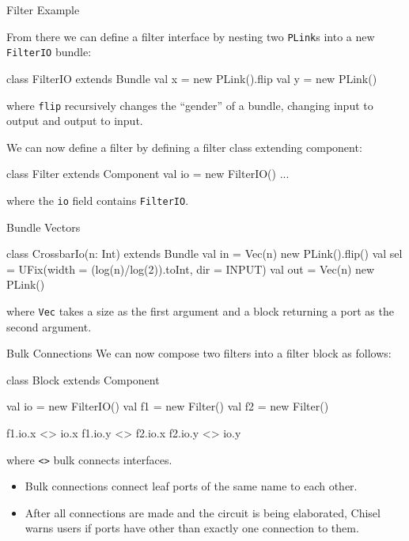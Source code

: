 \documentclass[xcolor=pdflatex,dvipsnames,table]{beamer}
\begin{document}
\begin{frame}{Filter Example}

From there we can define a filter interface by nesting two
\verb+PLink+s into a new \verb+FilterIO+ bundle:

\begin{scala}
class FilterIO extends Bundle { 
  val x = new PLink().flip
  val y = new PLink()
}
\end{scala}

\noindent
where \verb+flip+ recursively changes the ``gender'' of a bundle,
changing input to output and output to input.

We can now define a filter by defining a filter class extending component:

\begin{scala}
class Filter extends Component { 
  val io = new FilterIO()
  ...
}
\end{scala}

\noindent 
where the \verb+io+ field contains \verb+FilterIO+. 

\end{frame}

\begin{frame}[fragile]{Bundle Vectors}

\begin{scala}
class CrossbarIo(n: Int) extends Bundle {
  val in  = Vec(n){ new PLink().flip() }
  val sel = UFix(width = (log(n)/log(2)).toInt, dir = INPUT)
  val out = Vec(n){ new PLink() }
}
\end{scala}

\noindent
where \verb+Vec+ takes a size as the first argument and a block returning a port as the second argument.

\end{frame}

\begin{frame}[fragile]{Bulk Connections}
We can now compose two filters into a filter block as follows:

\begin{scala}
class Block extends Component { 
  val io = new FilterIO()
  val f1 = new Filter()
  val f2 = new Filter()

  f1.io.x <> io.x
  f1.io.y <> f2.io.x
  f2.io.y <> io.y
}
\end{scala}

\noindent
where \verb+<>+ bulk connects interfaces.
\begin{itemize}
\item Bulk connections connect leaf ports of the same name to each other.
\item After all connections are made and the circuit is being elaborated,
Chisel warns users if ports have other than exactly one connection to them.
\end{itemize}

\end{frame}
\end{document}
